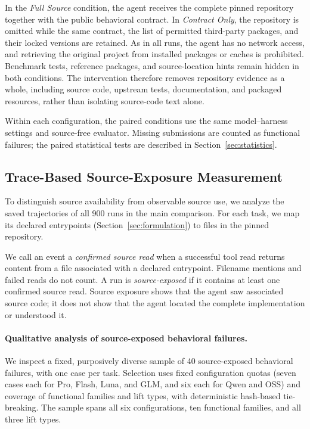 \documentclass[acmsmall,screen,review,anonymous]{acmart}
\begin{document}
In the \emph{Full Source} condition, the agent receives the complete pinned
repository together with the public behavioral contract. In \emph{Contract
Only}, the repository is omitted while the same contract, the list of permitted
third-party packages, and their locked versions are retained. As in all runs,
the agent has no network access, and retrieving the original project from
installed packages or caches is prohibited. Benchmark tests,
reference packages, and source-location hints remain hidden in both
conditions. The intervention therefore removes repository evidence as a whole,
including source code, upstream tests, documentation, and packaged resources,
rather than isolating source-code text alone.

Within each configuration, the paired conditions use the same model--harness
settings and source-free evaluator. Missing submissions are counted as
functional failures; the paired statistical tests are described in
Section~\ref{sec:statistics}.

\subsection{Trace-Based Source-Exposure Measurement}
\label{sec:source-exposure-protocol}

To distinguish source availability from observable source use, we analyze the
saved trajectories of all 900 runs in the main comparison. For
each task, we map its declared entrypoints
(Section~\ref{sec:formulation}) to files in the pinned repository.

We call an event a \emph{confirmed source read} when a successful tool read
returns content from a file associated with a declared entrypoint. Filename
mentions and failed reads do not count. A run is \emph{source-exposed} if it
contains at least one confirmed source read. Source exposure shows that the
agent saw associated source code; it does not show that the agent located the
complete implementation or understood it.

\paragraph{Qualitative analysis of source-exposed behavioral failures.}
We inspect a fixed, purposively diverse sample of 40 source-exposed behavioral
failures, with one case per task. Selection uses fixed configuration quotas
(seven cases each for Pro, Flash, Luna, and GLM, and six each for Qwen and OSS)
and coverage of functional families and lift types, with
deterministic hash-based tie-breaking. The sample spans all
six configurations, ten functional families, and all three lift types.
\end{document}
